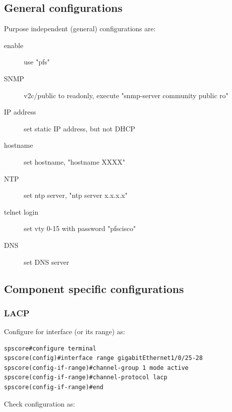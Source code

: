 \documentclass[a4paper,notitlepage]{article}
\begin{document}
\subsection{General configurations}

Purpose independent (general) configurations are:

\begin{description}
  \item[enable] use "pfs"
  \item[SNMP] v2c/public to readonly, execute "snmp-server community public ro"
  \item[IP address] set static IP address, but not DHCP
  \item[hostname] set hostname, "hostname XXXX"
  \item[NTP] set ntp server, "ntp server x.x.x.x"
  \item[telnet login] set vty 0-15 with password "pfscisco"
  \item[DNS] set DNS server
\end{description}


\subsection{Component specific configurations}

\subsubsection{LACP}

Configure for interface (or its range) as:

\begin{verbatim}
spscore#configure terminal 
spscore(config)#interface range gigabitEthernet1/0/25-28
spscore(config-if-range)#channel-group 1 mode active 
spscore(config-if-range)#channel-protocol lacp
spscore(config-if-range)#end
\end{verbatim}

Check configuration as:
\end{document}
